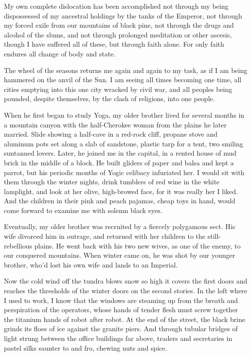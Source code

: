 \documentclass[english,11pt,letterpaper,onecolumn]{scrbook}
\begin{document}
	My own complete dislocation has been accomplished not through my being dispossessed of my ancestral holdings by the tanks of the Emperor, not through my forced exile from our mountains of black pine, not through the drugs and alcohol of the slums, and not through prolonged meditation or other ascesis, though I have suffered all of these, but through faith alone.  For only faith endures all change of body and state.

	The wheel of the seasons returns me again and again to my task, as if I am being hammered on the anvil of the Sun.  I am seeing all times becoming one time, all cities emptying into this one city wracked by civil war, and all peoples being pounded, despite themselves, by the clash of religions, into one people.

	When he first began to study Yoga, my older brother lived for several months in a mountain canyon with the half-Cherokee woman from the plains he later married.  Slide showing a half-cave in a red-rock cliff, propane stove and aluminum pots set along a slab of sandstone, plastic tarp for a tent, two smiling suntanned lovers.  Later, he joined me in the capital, in a rented house of mud brick in the middle of a block.  He built gliders of paper and balsa and kept a parrot, but his periodic months of Yogic celibacy infuriated her.  I would sit with them through the winter nights, drink tumblers of red wine in the white lamplight, and look at her olive, high-browed face, for it was really her I liked.  And the children in their pink and peach pajamas, cheap toys in hand, would come forward to examine me with solemn black eyes.

	Eventually, my older brother was recruited by a fiercely polygamous sect.  His wife divorced him in outrage, and returned with her children to the still-rebellious plains.  He went back with his two new wives, as one of the enemy, to our conquered mountains.  When winter came on, he was shot by our younger brother, who'd lost his own wife and lands to an Imperial.

	Now the cold wind off the tundra blows snow so high it covers the first doors and reaches the thresholds of the winter doors on the second stories.  In the loft where I used to work, I know that the windows are steaming up from the breath and perspiration of the operators, whose hands of tender flesh must screw together the titanium hands of robot after robot.  At the end of the street, the black brine grinds its floes of ice against the granite piers.  And through tubular bridges of light strung between the office buildings far above, traders and secretaries in pastel silks saunter to and fro, chewing nuts and spice.
\end{document}
